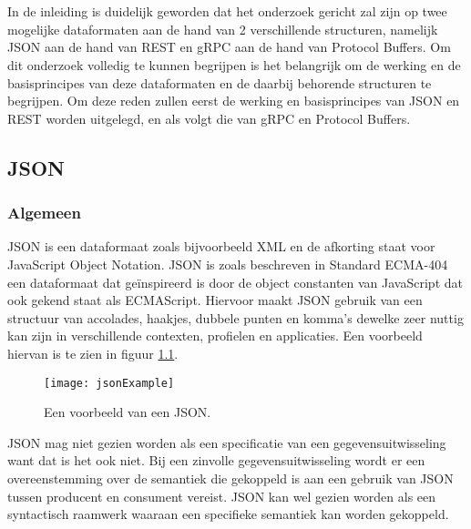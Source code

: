 \chapter{}
\label{ch:stand-van-zaken}



In de inleiding is duidelijk geworden dat het onderzoek gericht zal zijn op twee mogelijke dataformaten aan de hand van 2 verschillende structuren, namelijk JSON aan de hand van REST en gRPC aan de hand van Protocol Buffers. Om dit onderzoek volledig te kunnen begrijpen is het belangrijk om de werking en de basisprincipes van deze dataformaten en de daarbij behorende structuren te begrijpen. Om deze reden zullen eerst de werking en basisprincipes van JSON en REST worden uitgelegd, en als volgt die van gRPC en Protocol Buffers.

\section{JSON}
\label{sec:JSON}

\subsection{Algemeen}
\label{subsec:Algemeen}

JSON is een dataformaat zoals bijvoorbeeld XML en de afkorting staat voor JavaScript Object Notation. JSON is zoals beschreven in Standard ECMA-404 ~\autocite{Json2017} een dataformaat dat geïnspireerd is door de object constanten van JavaScript dat ook gekend staat als ECMAScript. Hiervoor maakt JSON gebruik van een structuur van accolades, haakjes, dubbele punten en komma's dewelke zeer nuttig kan zijn in verschillende contexten, profielen en applicaties. Een voorbeeld hiervan is te zien in figuur \ref{fig:jsonExample}.

\begin{figure}[H]
    \centering
    \texttt{[image: jsonExample]}
    \caption[JSON Example]{Een voorbeeld van een JSON.}
    \label{fig:jsonExample}
\end{figure}

JSON mag niet gezien worden als een specificatie van een gegevensuitwisseling want dat is het ook niet. Bij een zinvolle gegevensuitwisseling wordt er een overeenstemming over de semantiek die gekoppeld is aan een gebruik van JSON tussen producent en consument vereist. JSON kan wel gezien worden als een syntactisch raamwerk waaraan een specifieke semantiek kan worden gekoppeld.

